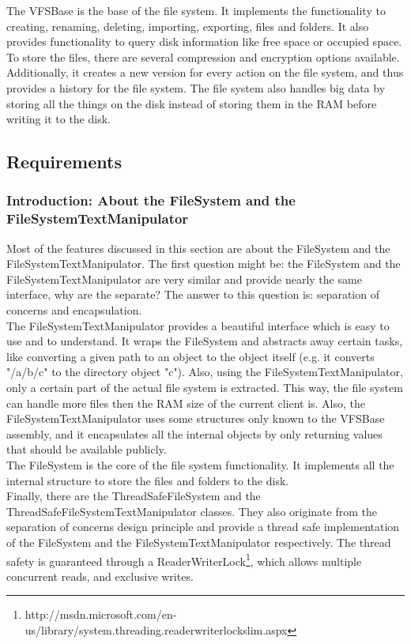 \documentclass[JCDReport.tex]{subfiles}
\begin{document}
The VFSBase is the base of the file system. It implements the functionality to creating, renaming, deleting, importing, exporting, files and folders. It also provides functionality to query disk information like free space or occupied space. To store the files, there are several compression and encryption options available. Additionally, it creates a new version for every action on the file system, and thus provides a history for the file system. The file system also handles big data by storing all the things on the disk instead of storing them in the RAM before writing it to the disk.

\subsection{Requirements}



\subsubsection{Introduction: About the FileSystem and the FileSystemTextManipulator}
Most of the features discussed in this section are about the FileSystem and the FileSystemTextManipulator. The first question might be: the FileSystem and the FileSystemTextManipulator are very similar and provide nearly the same interface, why are the separate? The answer to this question is: separation of concerns and encapsulation.\\
The FileSystemTextManipulator provides a beautiful interface which is easy to use and to understand. It wraps the FileSystem and abstracts away certain tasks, like converting a given path to an object to the object itself (e.g. it converts "/a/b/c" to the directory object "c"). Also, using the FileSystemTextManipulator, only a certain part of the actual file system is extracted. This way, the file system can handle more files then the RAM size of the current client is. Also, the FileSystemTextManipulator uses some structures only known to the VFSBase assembly, and it encapsulates all the internal objects by only returning values that should be available publicly.\\
The FileSystem is the core of the file system functionality. It implements all the internal structure to store the files and folders to the disk.\\
Finally, there are the ThreadSafeFileSystem and the ThreadSafeFileSystemTextManipulator classes. They also originate from the separation of concerns design principle and provide a thread safe implementation of the FileSystem and the FileSystemTextManipulator respectively. The thread safety is guaranteed through a ReaderWriterLock\footnote{http://msdn.microsoft.com/en-us/library/system.threading.readerwriterlockslim.aspx}, which allows multiple concurrent reads, and exclusive writes.
\end{document}
